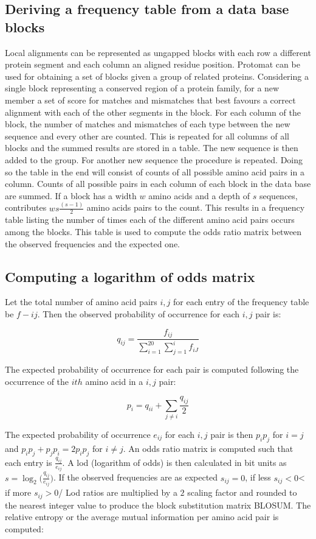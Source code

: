 	\subsection{Deriving a frequency table from a data base blocks}
	Local alignments can be represented as ungapped blocks with each row a different protein segment and each column an aligned residue position.
	Protomat can be used for obtaining a set of blocks given a group of related proteins.
	Considering a single block representing a conserved region of a protein family, for a new member a set of score for matches and mismatches that best favours a correct alignment with each of the other segments in the block.
	For each column of the block, the number of matches and mismatches of each type between the new sequence and every other are counted.
	This is repeated for all columns of all blocks and the summed results are stored in a table.
	The new sequence is then added to the group.
	For another new sequence the procedure is repeated.
	Doing so the table in the end will consist of counts of all possible amino acid pairs in a column.
	Counts of all possible pairs in each column of each block in the data base are summed.
	If a block has a width $w$ amino acids and a depth of $s$ sequences, contributes $ws\frac{(s-1)}{2}$ amino acids pairs to the count.
	This results in a frequency table listing the number of times each of the different amino acid pairs occurs among the blocks.
	This table is used to compute the odds ratio matrix between the observed frequencies and the expected one.

	\subsection{Computing a logarithm of odds matrix}
	Let the total number of amino acid pairs $i,j$ for each entry of the frequency table be $f-{ij}$.
	Then the observed probability of occurrence for each $i,j$ pair is:

	$$q_{ij} = \frac{f_{ij}}{\sum\limits_{i=1}^{20}\sum\limits_{j=1}^if_{iJ}}$$

	The expected probability of occurrence for each pair is computed following the occurrence of the $ith$ amino acid in a $i,j$ pair:

	$$p_i = q_{ii}+\sum\limits_{j\neq i}\frac{q_{ij}}{2}$$

	The expected probability of occurrence $e_{ij}$ for each $i,j$ pair is then $p_ip_j$ for $i=j$ and $p_ip_j + p_jp_i = 2p_ip_j$ for $i\neq j$.
	An odds ratio matrix is computed such that each entry is $\frac{q_{ij}}{e_{ij}}$.
	A lod (logarithm of odds) is then calculated in bit units as $s = \log_2\big(\frac{q_{ij}}{e_{ij}}\big)$.
	If the observed frequencies are as expected $s_{ij} = 0$, if less $s_{ij} < 0$< if more $s_{ij} > 0$/
	Lod ratios are multiplied by a $2$ scaling factor and rounded to the nearest integer value to produce the block substitution matrix BLOSUM.
	The relative entropy or the average mutual information per amino acid pair is computed:


